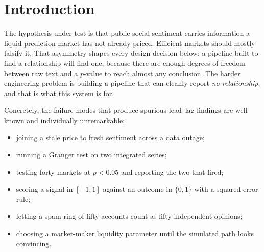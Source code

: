 \documentclass[11pt]{article}
\begin{document}
\setcounter{page}{1}
\pagestyle{fancy}

{}
\tableofcontents

\clearpage
{}
{}
\listoffigures

\vspace{1.2\baselineskip}
{}
\listoftables

\clearpage
{}
\setcounter{page}{1}

\section{Introduction}

The hypothesis under test is that public social sentiment carries information a
liquid prediction market has not already priced. Efficient markets should mostly
falsify it. That asymmetry shapes every design decision below: a pipeline built
to find a relationship will find one, because there are enough degrees of
freedom between raw text and a $p$-value to reach almost any conclusion. The
harder engineering problem is building a pipeline that can cleanly report
\emph{no relationship}, and that is what this system is for.

Concretely, the failure modes that produce spurious lead--lag findings are well
known and individually unremarkable:

\begin{itemize}\itemsep2pt
\item joining a stale price to fresh sentiment across a data outage;
\item running a Granger test on two integrated series;
\item testing forty markets at $p < 0.05$ and reporting the two that fired;
\item scoring a signal in $[-1,1]$ against an outcome in $\{0,1\}$ with a
      squared-error rule;
\item letting a spam ring of fifty accounts count as fifty independent opinions;
\item choosing a market-maker liquidity parameter until the simulated path
      looks convincing.
\end{itemize}
\end{document}
